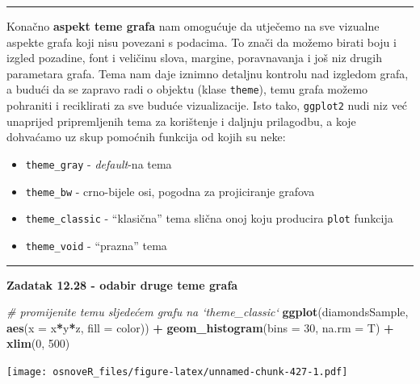 \documentclass[]{book}
\newenvironment{Shaded}{\begin{snugshade}}{\end{snugshade}}
\newcommand{\KeywordTok}[1]{\textcolor[rgb]{0.13,0.29,0.53}{\textbf{#1}}}
\newcommand{\DataTypeTok}[1]{\textcolor[rgb]{0.13,0.29,0.53}{#1}}
\newcommand{\DecValTok}[1]{\textcolor[rgb]{0.00,0.00,0.81}{#1}}
\newcommand{\StringTok}[1]{\textcolor[rgb]{0.31,0.60,0.02}{#1}}
\newcommand{\CommentTok}[1]{\textcolor[rgb]{0.56,0.35,0.01}{\textit{#1}}}
\newcommand{\OperatorTok}[1]{\textcolor[rgb]{0.81,0.36,0.00}{\textbf{#1}}}
\newcommand{\NormalTok}[1]{#1}
\providecommand{\tightlist}{%
  \setlength{\itemsep}{0pt}\setlength{\parskip}{0pt}}
\theoremstyle{definition}
\theoremstyle{definition}
\theoremstyle{definition}
\theoremstyle{remark}
\begin{document}
\begin{center}\rule{0.5\linewidth}{\linethickness}\end{center}

Konačno \textbf{aspekt teme grafa} nam omogućuje da utječemo na sve
vizualne aspekte grafa koji nisu povezani s podacima. To znači da možemo
birati boju i izgled pozadine, font i veličinu slova, margine,
poravnavanja i još niz drugih parametara grafa. Tema nam daje iznimno
detaljnu kontrolu nad izgledom grafa, a budući da se zapravo radi o
objektu (klase \texttt{theme}), temu grafa možemo pohraniti i
reciklirati za sve buduće vizualizacije. Isto tako, \texttt{ggplot2}
nudi niz već unaprijed pripremljenih tema za korištenje i daljnju
prilagodbu, a koje dohvaćamo uz skup pomoćnih funkcija od kojih su neke:

\begin{itemize}
\tightlist
\item
  \texttt{theme\_gray} - \emph{default}-na tema
\item
  \texttt{theme\_bw} - crno-bijele osi, pogodna za projiciranje grafova
\item
  \texttt{theme\_classic} - ``klasična'' tema slična onoj koju producira
  \texttt{plot} funkcija
\item
  \texttt{theme\_void} - ``prazna'' tema
\end{itemize}

\begin{center}\rule{0.5\linewidth}{\linethickness}\end{center}

\textbf{Zadatak 12.28 - odabir druge teme grafa}

\begin{Shaded}
\begin{Highlighting}[]
\CommentTok{# promijenite temu sljedećem grafu na `theme_classic`}
\KeywordTok{ggplot}\NormalTok{(diamondsSample, }\KeywordTok{aes}\NormalTok{(}\DataTypeTok{x =}\NormalTok{ x}\OperatorTok{*}\NormalTok{y}\OperatorTok{*}\NormalTok{z, }\DataTypeTok{fill =}\NormalTok{ color)) }\OperatorTok{+}\StringTok{ }
\StringTok{  }\KeywordTok{geom_histogram}\NormalTok{(}\DataTypeTok{bins =} \DecValTok{30}\NormalTok{, }\DataTypeTok{na.rm =}\NormalTok{ T) }\OperatorTok{+}\StringTok{ }
\StringTok{  }\KeywordTok{xlim}\NormalTok{(}\DecValTok{0}\NormalTok{, }\DecValTok{500}\NormalTok{) }
\end{Highlighting}
\end{Shaded}

\texttt{[image: osnoveR\_files/figure-latex/unnamed-chunk-427-1.pdf]}
\end{document}
